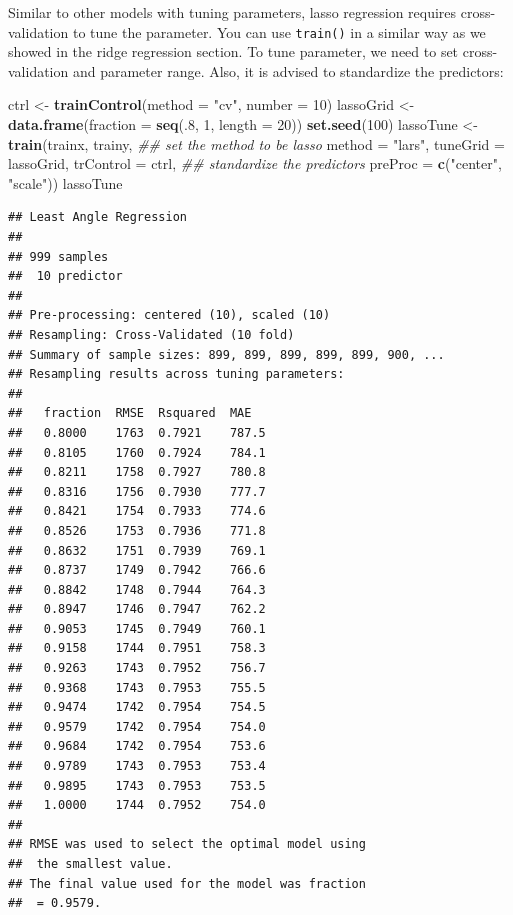 \documentclass[12pt,]{krantz}
\makeatletter
\newenvironment{Shaded}{\begin{snugshade}}{\end{snugshade}}
\newcommand{\CommentTok}[1]{\textcolor[rgb]{0.37,0.37,0.37}{\textit{#1}}}
\newcommand{\DataTypeTok}[1]{\textcolor[rgb]{0.27,0.27,0.27}{#1}}
\newcommand{\DecValTok}[1]{\textcolor[rgb]{0.06,0.06,0.06}{#1}}
\newcommand{\KeywordTok}[1]{\textcolor[rgb]{0.27,0.27,0.27}{\textbf{#1}}}
\newcommand{\NormalTok}[1]{#1}
\newcommand{\StringTok}[1]{\textcolor[rgb]{0.5,0.5,0.5}{#1}}
\newenvironment{kframe}{%
\medskip{}
\setlength{\fboxsep}{.8em}
 \def\at@end@of@kframe{}%
 \ifinner\ifhmode%
  \def\at@end@of@kframe{\end{minipage}}%
  \begin{minipage}{\columnwidth}%
 \fi\fi%
 \def\FrameCommand##1{\hskip\@totalleftmargin \hskip-\fboxsep
 \colorbox{shadecolor}{##1}\hskip-\fboxsep
     \hskip-\linewidth \hskip-\@totalleftmargin \hskip\columnwidth}%
 \MakeFramed {\advance\hsize-\width
   \@totalleftmargin\z@ \linewidth\hsize
   \@setminipage}}%
 {\par\unskip\endMakeFramed%
 \at@end@of@kframe}
\renewenvironment{Shaded}{\begin{kframe}}{\end{kframe}}
\makeatother
\begin{document}
Similar to other models with tuning parameters, lasso regression requires cross-validation to tune the parameter. You can use \texttt{train()} in a similar way as we showed in the ridge regression section. To tune parameter, we need to set cross-validation and parameter range. Also, it is advised to standardize the predictors:

\begin{Shaded}
\begin{Highlighting}[]
\NormalTok{ctrl <-}\StringTok{ }\KeywordTok{trainControl}\NormalTok{(}\DataTypeTok{method =} \StringTok{"cv"}\NormalTok{, }\DataTypeTok{number =} \DecValTok{10}\NormalTok{)}
\NormalTok{lassoGrid <-}\StringTok{ }\KeywordTok{data.frame}\NormalTok{(}\DataTypeTok{fraction =} \KeywordTok{seq}\NormalTok{(.}\DecValTok{8}\NormalTok{, }\DecValTok{1}\NormalTok{, }\DataTypeTok{length =} \DecValTok{20}\NormalTok{))}
\KeywordTok{set.seed}\NormalTok{(}\DecValTok{100}\NormalTok{)}
\NormalTok{lassoTune <-}\StringTok{ }\KeywordTok{train}\NormalTok{(trainx, trainy,}
                      \CommentTok{## set the method to be lasso}
                      \DataTypeTok{method =} \StringTok{"lars"}\NormalTok{,}
                      \DataTypeTok{tuneGrid =}\NormalTok{ lassoGrid,}
                      \DataTypeTok{trControl =}\NormalTok{ ctrl,}
                      \CommentTok{## standardize the predictors}
                      \DataTypeTok{preProc =} \KeywordTok{c}\NormalTok{(}\StringTok{"center"}\NormalTok{, }\StringTok{"scale"}\NormalTok{))}
\NormalTok{lassoTune}
\end{Highlighting}
\end{Shaded}

\begin{verbatim}
## Least Angle Regression 
## 
## 999 samples
##  10 predictor
## 
## Pre-processing: centered (10), scaled (10) 
## Resampling: Cross-Validated (10 fold) 
## Summary of sample sizes: 899, 899, 899, 899, 899, 900, ... 
## Resampling results across tuning parameters:
## 
##   fraction  RMSE  Rsquared  MAE  
##   0.8000    1763  0.7921    787.5
##   0.8105    1760  0.7924    784.1
##   0.8211    1758  0.7927    780.8
##   0.8316    1756  0.7930    777.7
##   0.8421    1754  0.7933    774.6
##   0.8526    1753  0.7936    771.8
##   0.8632    1751  0.7939    769.1
##   0.8737    1749  0.7942    766.6
##   0.8842    1748  0.7944    764.3
##   0.8947    1746  0.7947    762.2
##   0.9053    1745  0.7949    760.1
##   0.9158    1744  0.7951    758.3
##   0.9263    1743  0.7952    756.7
##   0.9368    1743  0.7953    755.5
##   0.9474    1742  0.7954    754.5
##   0.9579    1742  0.7954    754.0
##   0.9684    1742  0.7954    753.6
##   0.9789    1743  0.7953    753.4
##   0.9895    1743  0.7953    753.5
##   1.0000    1744  0.7952    754.0
## 
## RMSE was used to select the optimal model using
##  the smallest value.
## The final value used for the model was fraction
##  = 0.9579.
\end{verbatim}
\end{document}
